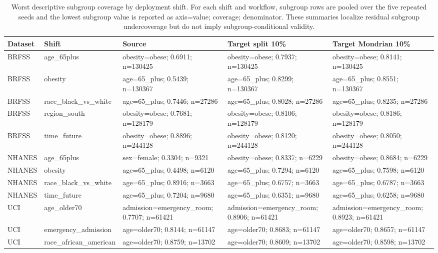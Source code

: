 \begin{table}[!tbp]
\centering
\caption{Worst descriptive subgroup coverage by deployment shift. For each shift and workflow, subgroup rows are pooled over the five repeated seeds and the lowest subgroup value is reported as axis=value; coverage; denominator. These summaries localize residual subgroup undercoverage but do not imply subgroup-conditional validity.}
\label{tab:shift_subgroup_worst_cases}
\scriptsize
\setlength{\tabcolsep}{2.5pt}
\renewcommand{\arraystretch}{1.08}
\begin{tabularx}{\textwidth}{@{}L{1.4cm}L{2.5cm}YYY@{}}
\toprule
Dataset & Shift & Source & Target split 10\% & Target Mondrian 10\% \\
\midrule
BRFSS & age\_65plus & obesity=obese; 0.6911; n=130425 & obesity=obese; 0.7937; n=130425 & obesity=obese; 0.8141; n=130425 \\
BRFSS & obesity & age=65\_plus; 0.5439; n=130367 & age=65\_plus; 0.8299; n=130367 & age=65\_plus; 0.8551; n=130367 \\
BRFSS & race\_black\_vs\_white & age=65\_plus; 0.7446; n=27286 & age=65\_plus; 0.8028; n=27286 & age=65\_plus; 0.8235; n=27286 \\
BRFSS & region\_south & obesity=obese; 0.7681; n=128179 & obesity=obese; 0.8106; n=128179 & obesity=obese; 0.8186; n=128179 \\
BRFSS & time\_future & obesity=obese; 0.8896; n=244128 & obesity=obese; 0.8120; n=244128 & obesity=obese; 0.8050; n=244128 \\
NHANES & age\_65plus & sex=female; 0.3304; n=9321 & obesity=obese; 0.8337; n=6229 & obesity=obese; 0.8684; n=6229 \\
NHANES & obesity & age=65\_plus; 0.4498; n=6120 & age=65\_plus; 0.7294; n=6120 & age=65\_plus; 0.7598; n=6120 \\
NHANES & race\_black\_vs\_white & age=65\_plus; 0.8916; n=3663 & age=65\_plus; 0.6757; n=3663 & age=65\_plus; 0.6787; n=3663 \\
NHANES & time\_future & age=65\_plus; 0.7204; n=9680 & age=65\_plus; 0.6351; n=9680 & age=65\_plus; 0.6258; n=9680 \\
UCI & age\_older70 & admission=emergency\_room; 0.7707; n=61421 & admission=emergency\_room; 0.8906; n=61421 & admission=emergency\_room; 0.8923; n=61421 \\
UCI & emergency\_admission & age=older70; 0.8144; n=61147 & age=older70; 0.8683; n=61147 & age=older70; 0.8657; n=61147 \\
UCI & race\_african\_american & age=older70; 0.8759; n=13702 & age=older70; 0.8609; n=13702 & age=older70; 0.8598; n=13702 \\
\bottomrule
\end{tabularx}
\end{table}
